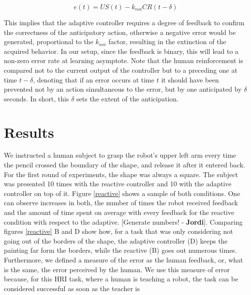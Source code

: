 \documentclass[letterpaper, 10 pt, conference]{ieeeconf}  %
\newcommand\jp[1]{{\color{red}}{\color{red}}{\footnotesize \color{red}[#1 - \textbf{Jordi}]}} %
\begin{document}
\[
e(t) = US(t) - k_{noi} CR(t-\delta)
\]

This implies that the adaptive controller requires a degree of feedback to confirm the correctness of the anticipatory action, otherwise a negative error would be generated, proportional to the $k_{noi}$ factor, resulting in the extinction of the acquired behavior. In our setup, since the feedback is binary, this will lead to a non-zero error rate at learning asymptote. Note that the human reinforcement is compared not to the current output of the controller but to a preceding one at time $t-\delta$, denoting that if an error occurs at time $t$ it should have been prevented not by an action simultaneous to the error, but by one anticipated by $\delta$ seconds. In short, this $\delta$ sets the extent of the anticipation.





\section{Results}
\label{sec:results}

We instructed a human subject to grasp the robot's upper left arm every time the pencil crossed the boundary of the shape, and release it after it entered back. For the first round of experiments, the shape was always a square. The subject was presented 10 times with the reactive controller and 10 with the adaptive controller on top of it. 
Figure \ref{reactive} shows a sample of both conditions. One can observe increases in both, the number of times the robot received feedback and the amount of time spent on average with every feedback for the reactive condition with respect to the adaptive. \jp{Generate numbers!}. Comparing figures \ref{reactive} B and D show how, for a task that was only considering not going out of the borders of the shape, the adaptive controller (D) keeps the painting far form the borders, while the reactive (B) goes out numerous times. 
Furthermore, we defined a measure of the error as the human feedback, or, what is the same, the error perceived by the human. We use this measure of error because, for this HRI task, where a human is teaching a robot, the task can be considered successful as soon as the teacher is 
\end{document}
